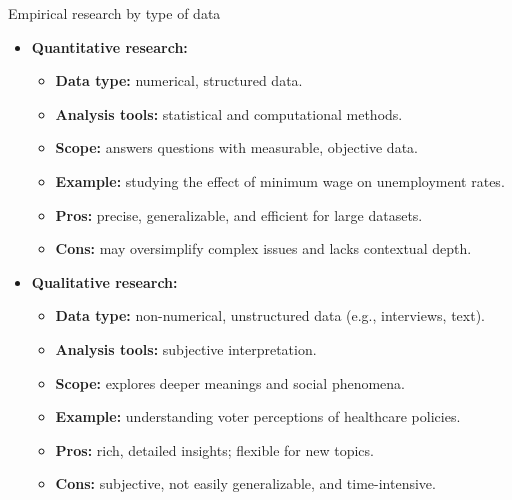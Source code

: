 \documentclass[aspectratio=169]{beamer}
\begin{document}
\begin{frame}{Empirical research by type of data}

\begin{itemize}
    \item \textbf{Quantitative research:} 
    \begin{itemize}
        \item[$\bullet$] \textbf{Data type:} numerical, structured data.
        \item[$\bullet$] \textbf{Analysis tools:} statistical and computational methods.
        \item[$\bullet$] \textbf{Scope:} answers questions with measurable, objective data.
        \item[$\bullet$] \textbf{Example:} studying the effect of minimum wage on unemployment rates.
        \item[$\bullet$] \textbf{Pros:} precise, generalizable, and efficient for large datasets.
        \item[$\bullet$] \textbf{Cons:} may oversimplify complex issues and lacks contextual depth.
    \end{itemize}
    \vspace{0.2cm}
    
    \item \textbf{Qualitative research:} 
    \begin{itemize}
        \item[$\bullet$] \textbf{Data type:} non-numerical, unstructured data (e.g., interviews, text).
        \item[$\bullet$] \textbf{Analysis tools:} subjective interpretation.
        \item[$\bullet$] \textbf{Scope:} explores deeper meanings and social phenomena.
        \item[$\bullet$] \textbf{Example:} understanding voter perceptions of healthcare policies.
        \item[$\bullet$] \textbf{Pros:} rich, detailed insights; flexible for new topics.
        \item[$\bullet$] \textbf{Cons:} subjective, not easily generalizable, and time-intensive.
    \end{itemize}
\end{itemize}

    
\end{frame}
\end{document}
